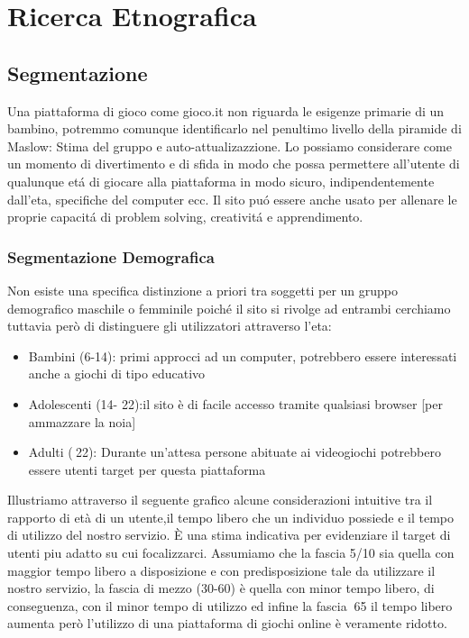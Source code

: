 \documentclass[../Report.tex]{subfiles}
\begin{document}
    \chapter{Ricerca Etnografica}
    \section{Segmentazione}
    Una piattaforma di gioco come gioco.it non riguarda le esigenze primarie di un bambino, potremmo comunque identificarlo nel penultimo livello della piramide di Maslow: Stima del gruppo e auto-attualizazzione.
    Lo possiamo considerare come un momento di divertimento e di sfida in modo che possa permettere all’utente di qualunque etá di giocare alla piattaforma in modo sicuro, indipendentemente dall’eta, specifiche del computer ecc.
    Il sito puó essere anche usato per allenare le proprie capacitá di problem solving, creativitá e apprendimento.

    \subsection{Segmentazione Demografica}
    
    Non esiste una specifica distinzione a priori tra soggetti per un gruppo demografico maschile o femminile poiché il sito si rivolge ad entrambi cerchiamo tuttavia però di distinguere gli utilizzatori attraverso l’eta:
    \begin{itemize}
        \item Bambini (6-14): primi approcci ad un computer, potrebbero essere interessati anche a giochi di tipo educativo
        \item Adolescenti (14- 22):il sito è di facile accesso tramite qualsiasi browser [per ammazzare la noia]
        \item Adulti ($\>$22): Durante un’attesa persone abituate ai videogiochi potrebbero essere utenti target per questa piattaforma
    \end{itemize}

    Illustriamo attraverso il seguente grafico alcune considerazioni intuitive tra il rapporto di età di un utente,il tempo libero che un individuo possiede e il tempo di utilizzo del nostro servizio. 
    È una stima indicativa per evidenziare il target di utenti piu adatto su cui focalizzarci.
    Assumiamo che la fascia 5/10 sia quella con maggior tempo libero a disposizione e con predisposizione tale da utilizzare il nostro servizio, la fascia di mezzo (30-60) è quella con minor tempo libero, di conseguenza, con il minor tempo di utilizzo ed infine la fascia $\>$65 il tempo libero aumenta però l’utilizzo di una piattaforma di giochi online è veramente ridotto. 
\end{document}

